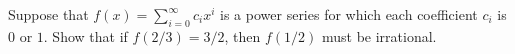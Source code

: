 Suppose that $f(x) = \sum_{i=0}^\infty c_i x^i$ is a power series for which each coefficient $c_i$ is $0$ or $1$.
Show that if $f(2/3) = 3/2$, then $f(1/2)$ must be irrational.
